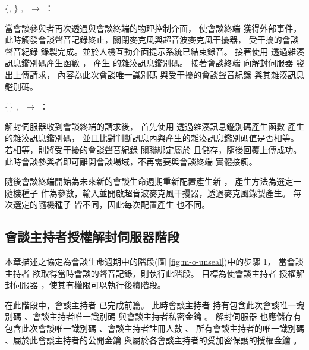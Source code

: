 \begin{pmsgs}
    \item $\{$\DEFsessionID, \DEFrecJ$\}$ $,~$ \DEFmeetingbox $\rightarrow$ \DEFserver：

        當會談參與者再次透過與會談終端的物理控制介面，
    使會談終端 \DEFmeetingbox 獲得外部事件，此時觸發會談聲音記錄終止，關閉麥克風與超音波麥克風干擾器，
    受干擾的會談聲音紀錄 \DEFrecJ 錄製完成。並於人機互動介面提示系統已結束錄音。
    接著使用 \DEFmboxKey 透過雜湊訊息鑑別碼產生函數 \DEFfuncHMAC{}，
    產生 \DEFrecJ 的雜湊訊息鑑別碼。
    接著會談終端 \DEFmeetingbox 向解封伺服器 \DEFserver 發出上傳請求，
    內容為此次會談唯一識別碼 \DEFsessionID 與受干擾的會談聲音紀錄 \DEFrecJ 與其雜湊訊息鑑別碼。

    \item $\{\}$ $,~$ \DEFserver $\rightarrow$ \DEFmeetingbox：

        解封伺服器收到會談終端的請求後，
    首先使用 \DEFmboxKey 透過雜湊訊息鑑別碼產生函數 \DEFfuncHMAC{} 產生 \DEFrecJ 的雜湊訊息鑑別碼，
    並且比對判斷訊息內與產生的雜湊訊息鑑別碼值是否相等。
    若相等，則將受干擾的會談聲音紀錄 \DEFrecJ 關聯綁定屬於 \DEFsessionID 且儲存，隨後回覆上傳成功。
    此時會談參與者即可離開會談場域，不再需要與會談終端 \DEFmeetingbox 實體接觸。

        隨後會談終端開始為未來新的會談生命週期重新配置產生新 \DEFrecN，
    產生方法為選定一隨機種子 \DEFseed 作為參數，輸入並開啟超音波麥克風干擾器，透過麥克風錄製產生。
    每次選定的隨機種子 \DEFseed 皆不同，因此每次配置產生 \DEFrecN 也不同。
\end{pmsgs}


\subsection{會談主持者授權解封伺服器階段}\label{subsec:protocol-unseal-auth}

    本章描述之協定為會談生命週期中的階段(圖 \ref{fig:m-o-unseal})中的步驟 1，
當會談主持者 \DEFowner 欲取得當時會談的聲音記錄，則執行此階段。
目標為使會談主持者 \DEFowner 授權解封伺服器 \DEFserver，使其有權限可以執行後續階段。

    在此階段中，會談主持者 \DEFowner 已完成前篇。
此時會談主持者 \DEFowner 持有包含此次會談唯一識別碼 \DEFsessionID、會談主持者唯一識別碼 \DEFownerID
與會談主持者私密金鑰 \DEFprivateKey。
解封伺服器 \DEFserver 也應儲存有包含此次會談唯一識別碼 \DEFsessionID、會談主持者註冊人數 \DEFowreg、
所有會談主持者的唯一識別碼 \DEFownerID、屬於此會談主持者的公開金鑰 \DEFprivateKey
與屬於各會談主持者的受加密保護的授權金鑰 \DEFakEnc。

